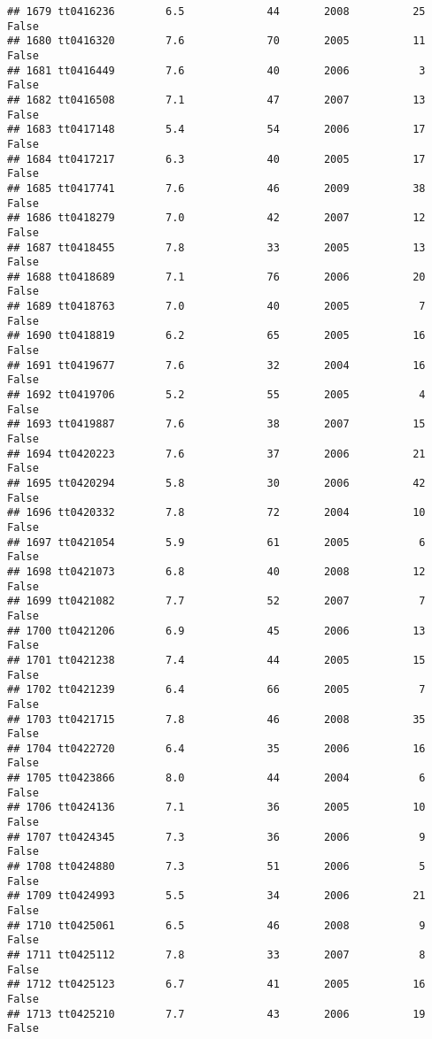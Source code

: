\documentclass[
]{article}
\begin{document}
\begin{verbatim}
## 1679 tt0416236        6.5             44       2008          25   False
## 1680 tt0416320        7.6             70       2005          11   False
## 1681 tt0416449        7.6             40       2006           3   False
## 1682 tt0416508        7.1             47       2007          13   False
## 1683 tt0417148        5.4             54       2006          17   False
## 1684 tt0417217        6.3             40       2005          17   False
## 1685 tt0417741        7.6             46       2009          38   False
## 1686 tt0418279        7.0             42       2007          12   False
## 1687 tt0418455        7.8             33       2005          13   False
## 1688 tt0418689        7.1             76       2006          20   False
## 1689 tt0418763        7.0             40       2005           7   False
## 1690 tt0418819        6.2             65       2005          16   False
## 1691 tt0419677        7.6             32       2004          16   False
## 1692 tt0419706        5.2             55       2005           4   False
## 1693 tt0419887        7.6             38       2007          15   False
## 1694 tt0420223        7.6             37       2006          21   False
## 1695 tt0420294        5.8             30       2006          42   False
## 1696 tt0420332        7.8             72       2004          10   False
## 1697 tt0421054        5.9             61       2005           6   False
## 1698 tt0421073        6.8             40       2008          12   False
## 1699 tt0421082        7.7             52       2007           7   False
## 1700 tt0421206        6.9             45       2006          13   False
## 1701 tt0421238        7.4             44       2005          15   False
## 1702 tt0421239        6.4             66       2005           7   False
## 1703 tt0421715        7.8             46       2008          35   False
## 1704 tt0422720        6.4             35       2006          16   False
## 1705 tt0423866        8.0             44       2004           6   False
## 1706 tt0424136        7.1             36       2005          10   False
## 1707 tt0424345        7.3             36       2006           9   False
## 1708 tt0424880        7.3             51       2006           5   False
## 1709 tt0424993        5.5             34       2006          21   False
## 1710 tt0425061        6.5             46       2008           9   False
## 1711 tt0425112        7.8             33       2007           8   False
## 1712 tt0425123        6.7             41       2005          16   False
## 1713 tt0425210        7.7             43       2006          19   False

\end{verbatim}
\end{document}
